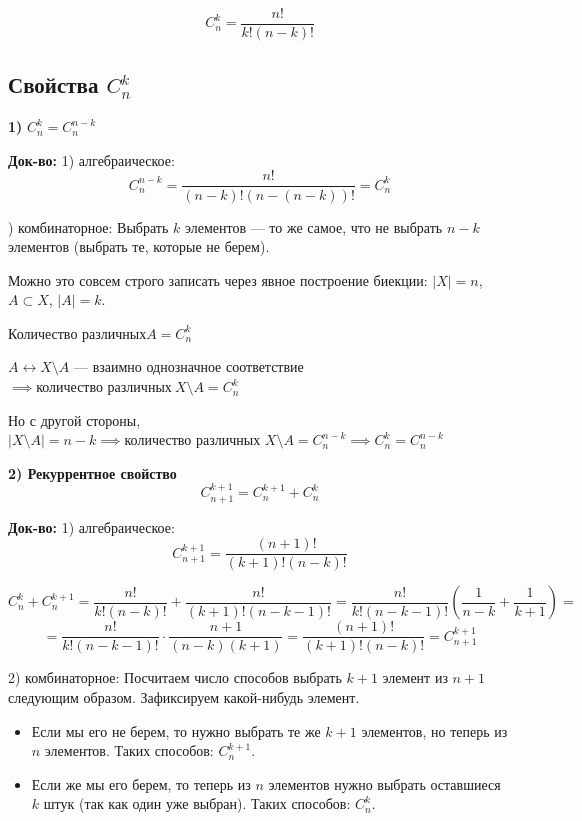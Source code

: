 \documentclass[10pt, a4paper]{article}
\begin{document}
$$C_n^k = \frac{n!}{k!(n-k)!}$$

\subsection*{Свойства $C_n^k$}

\noindent \textbf{1)} $C_n^k = C_n^{n-k}$

\vspace{0.2cm}
\noindent \textbf{Док-во:}
1) алгебраическое:
$$C_n^{n-k} = \frac{n!}{(n-k)!(n-(n-k))!} = C_n^k$$

) комбинаторное: Выбрать $k$ элементов — то же самое, что не выбрать $n-k$ элементов (выбрать те, которые не берем).

\vspace{0.2cm}

\noindent Можно это совсем строго записать через явное построение биекции: $|X| = n$, $A \subset X$, $|A| = k$.

\noindent $\text{Количество различных} A = C_n^k$

\noindent $A \longleftrightarrow X \setminus A$ — взаимно однозначное соответствие $\implies \text{количество различных}\ X \setminus A = C_n^k$

\vspace{0.2cm}
\noindent Но с другой стороны, $|X \setminus A| = n - k \implies \text{количество различных } X \setminus A = C_n^{n-k} \implies C_n^k = C_n^{n-k}$

\medskip
\noindent \textbf{2) Рекуррентное свойство}
$$C_{n+1}^{k+1} = C_n^{k+1} + C_n^k$$

\noindent \textbf{Док-во:}
1) алгебраическое:
$$C_{n+1}^{k+1} = \frac{(n+1)!}{(k+1)!(n-k)!}$$

$$C_n^k + C_n^{k+1} = \frac{n!}{k!(n-k)!} + \frac{n!}{(k+1)!(n-k-1)!} = \frac{n!}{k!(n-k-1)!} \left( \frac{1}{n-k} + \frac{1}{k+1} \right) =$$
$$= \frac{n!}{k!(n-k-1)!} \cdot \frac{n+1}{(n-k)(k+1)} = \frac{(n+1)!}{(k+1)!(n-k)!} = C_{n+1}^{k+1}$$

\vspace{0.2cm}
2) комбинаторное: Посчитаем число способов выбрать $k+1$ элемент из $n+1$ следующим образом. Зафиксируем какой-нибудь элемент.
\begin{itemize}
    \item Если мы его не берем, то нужно выбрать те же $k+1$ элементов, но теперь из $n$  элементов. Таких способов: $C_n^{k+1}$.
    \item Если же мы его берем, то теперь из $n$ элементов нужно выбрать оставшиеся $k$ штук (так как один уже выбран). Таких способов: $C_n^k$.
\end{itemize}
\end{document}
